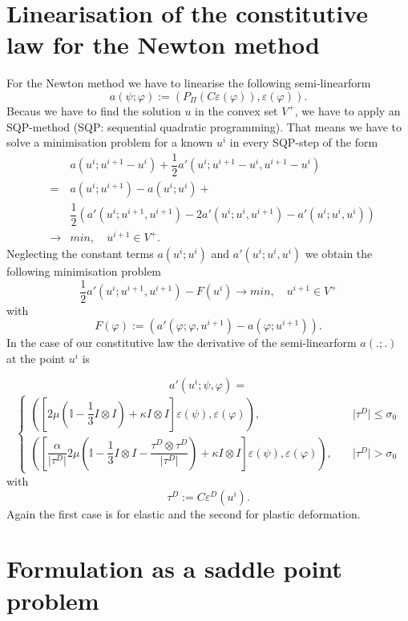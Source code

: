 \documentclass{article}
\begin{document}
\section{Linearisation of the constitutive law for the Newton method}

For the Newton method we have to linearise the following semi-linearform
$$a(\psi;\varphi) := \left(P_{\Pi}(C\varepsilon(\varphi)),\varepsilon(\varphi)\right).$$
Becaus we have to find the solution $u$ in the convex set $V^+$, we have to apply an SQP-method (SQP: sequential quadratic
programming). That means we have to solve a minimisation problem for a known $u^i$ in every SQP-step of the form
\begin{eqnarray*}
 & & a(u^{i};u^{i+1} - u^i) + \dfrac{1}{2}a'(u^i;u^{i+1} - u^i,u^{i+1} - u^i)\\
 &=&  a(u^i;u^{i+1}) -  a(u^i;u^i) +\\
 & & \dfrac{1}{2}\left( a'(u^i;u^{i+1},u^{i+1}) - 2a'(u^i;u^i,u^{i+1}) - a'(u^i;u^i,u^i)\right)\\
 &\rightarrow& min,\quad u^{i+1}\in V^+.
\end{eqnarray*}
Neglecting the constant terms $ a(u^i;u^i)$ and $ a'(u^i;u^i,u^i)$ we obtain the following minimisation problem
$$\dfrac{1}{2} a'(u^i;u^{i+1},u^{i+1}) - F(u^i)\rightarrow min,\quad u^{i+1}\in V^+$$
with
$$F(\varphi) := \left(a'(\varphi;\varphi,u^{i+1}) -  a(\varphi;u^{i+1}) \right).$$
In the case of our constitutive law the derivative of the semi-linearform $a(.;.)$ at the point $u^i$ is

$$a'(u^i;\psi,\varphi) =$$
$$
\begin{cases}
\left(\left[2\mu\left(\mathbb{I}  - \dfrac{1}{3} I\otimes I\right) + \kappa I\otimes I\right]\varepsilon(\psi),\varepsilon(\varphi)\right), & \quad
      \vert \tau^D \vert \leq \sigma_0\\
\left(\left[\dfrac{\alpha}{\vert\tau^D\vert}2\mu\left(\mathbb{I}  - \dfrac{1}{3} I\otimes I - \dfrac{\tau^D\otimes\tau^D}{\vert\tau^D\vert}\right) +
      \kappa I\otimes I\right]\varepsilon(\psi),\varepsilon(\varphi) \right), &
 \quad \vert \tau^D \vert > \sigma_0
\end{cases}
$$
with
$$\tau^D :=  C\varepsilon^D(u^i).$$
Again the first case is for elastic and the second for plastic deformation.

\section{Formulation as a saddle point problem}
\end{document}
